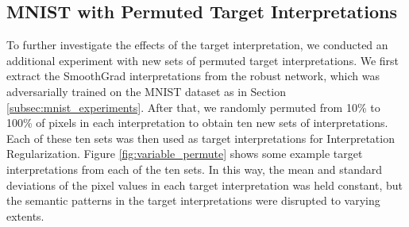


\subsection{MNIST with Permuted Target Interpretations} \label{subsec:variable_permute_setup}

To further investigate the effects of the target interpretation, we conducted an additional experiment with new sets of permuted target interpretations. We first extract the SmoothGrad interpretations from the robust network, which was adversarially trained on the MNIST dataset as in Section \ref{subsec:mnist_experiments}. After that, we randomly permuted from 10\% to 100\% of pixels in each  interpretation to obtain ten new sets of interpretations. Each of these ten sets was then used as target interpretations for Interpretation Regularization. Figure \ref{fig:variable_permute}   shows some example target interpretations from each of the ten sets. 
In this way, the mean and standard deviations of the pixel values in each target interpretation was held constant, but the semantic patterns in the target interpretations were disrupted to varying extents. 


